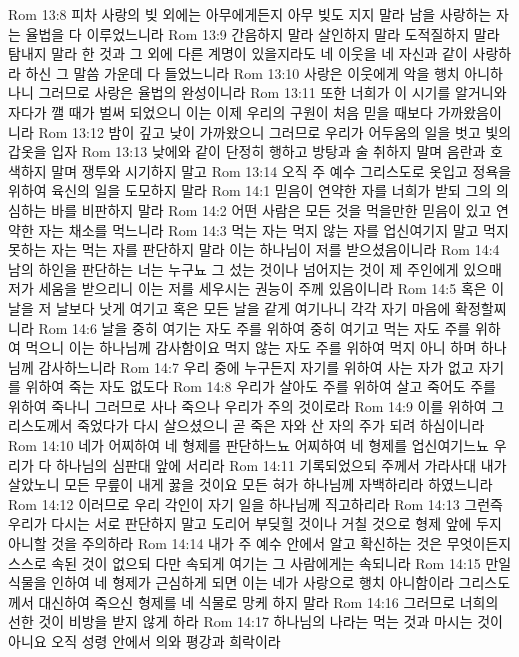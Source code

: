 Rom 13:8  피차 사랑의 빚 외에는 아무에게든지 아무 빚도 지지 말라 남을 사랑하는 자는 율법을 다 이루었느니라
Rom 13:9  간음하지 말라 살인하지 말라 도적질하지 말라 탐내지 말라 한 것과 그 외에 다른 계명이 있을지라도 네 이웃을 네 자신과 같이 사랑하라 하신 그 말씀 가운데 다 들었느니라
Rom 13:10  사랑은 이웃에게 악을 행치 아니하나니 그러므로 사랑은 율법의 완성이니라
Rom 13:11  또한 너희가 이 시기를 알거니와 자다가 깰 때가 벌써 되었으니 이는 이제 우리의 구원이 처음 믿을 때보다 가까왔음이니라
Rom 13:12  밤이 깊고 낮이 가까왔으니 그러므로 우리가 어두움의 일을 벗고 빛의 갑옷을 입자
Rom 13:13  낮에와 같이 단정히 행하고 방탕과 술 취하지 말며 음란과 호색하지 말며 쟁투와 시기하지 말고
Rom 13:14  오직 주 예수 그리스도로 옷입고 정욕을 위하여 육신의 일을 도모하지 말라
Rom 14:1  믿음이 연약한 자를 너희가 받되 그의 의심하는 바를 비판하지 말라
Rom 14:2  어떤 사람은 모든 것을 먹을만한 믿음이 있고 연약한 자는 채소를 먹느니라
Rom 14:3  먹는 자는 먹지 않는 자를 업신여기지 말고 먹지 못하는 자는 먹는 자를 판단하지 말라 이는 하나님이 저를 받으셨음이니라
Rom 14:4  남의 하인을 판단하는 너는 누구뇨 그 섰는 것이나 넘어지는 것이 제 주인에게 있으매 저가 세움을 받으리니 이는 저를 세우시는 권능이 주께 있음이니라
Rom 14:5  혹은 이날을 저 날보다 낫게 여기고 혹은 모든 날을 같게 여기나니 각각 자기 마음에 확정할찌니라
Rom 14:6  날을 중히 여기는 자도 주를 위하여 중히 여기고 먹는 자도 주를 위하여 먹으니 이는 하나님께 감사함이요 먹지 않는 자도 주를 위하여 먹지 아니 하며 하나님께 감사하느니라
Rom 14:7  우리 중에 누구든지 자기를 위하여 사는 자가 없고 자기를 위하여 죽는 자도 없도다
Rom 14:8  우리가 살아도 주를 위하여 살고 죽어도 주를 위하여 죽나니 그러므로 사나 죽으나 우리가 주의 것이로라
Rom 14:9  이를 위하여 그리스도께서 죽었다가 다시 살으셨으니 곧 죽은 자와 산 자의 주가 되려 하심이니라
Rom 14:10  네가 어찌하여 네 형제를 판단하느뇨 어찌하여 네 형제를 업신여기느뇨 우리가 다 하나님의 심판대 앞에 서리라
Rom 14:11  기록되었으되 주께서 가라사대 내가 살았노니 모든 무릎이 내게 꿇을 것이요 모든 혀가 하나님께 자백하리라 하였느니라
Rom 14:12  이러므로 우리 각인이 자기 일을 하나님께 직고하리라
Rom 14:13  그런즉 우리가 다시는 서로 판단하지 말고 도리어 부딪힐 것이나 거칠 것으로 형제 앞에 두지 아니할 것을 주의하라
Rom 14:14  내가 주 예수 안에서 알고 확신하는 것은 무엇이든지 스스로 속된 것이 없으되 다만 속되게 여기는 그 사람에게는 속되니라
Rom 14:15  만일 식물을 인하여 네 형제가 근심하게 되면 이는 네가 사랑으로 행치 아니함이라 그리스도께서 대신하여 죽으신 형제를 네 식물로 망케 하지 말라
Rom 14:16  그러므로 너희의 선한 것이 비방을 받지 않게 하라
Rom 14:17  하나님의 나라는 먹는 것과 마시는 것이 아니요 오직 성령 안에서 의와 평강과 희락이라
